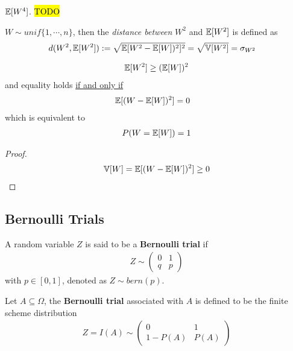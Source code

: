 \documentclass{article}
\begin{document}
   	\begin{proposition}
   		$\mathbb{E}[{W^4}]$. \hl{TODO}
   	\end{proposition}
   	
   	\begin{definition}
   		$W \sim unif\{1, \cdots, n\}$, then the \emph{distance between} $W^2$ and $\mathbb{E}[{W^2}]$ is defined as
   		\begin{align}
   			d(W^2, \mathbb{E}[{W^2}]) &:= \sqrt{\mathbb{E}[{W^2 - \mathbb{E}[{W}])^2}]^2} = \sqrt{\mathbb{V}[{W^2}]} = \sigma_{W^2}
   		\end{align}
   	\end{definition}
   	
   	\begin{corollary}
   		\begin{align}
   			\mathbb{E}[{W^2}] \geq (\mathbb{E}[{W}])^2
   		\end{align}
   		and equality holds \ul{if and only if}
   		\begin{align}
   			\mathbb{E}[{(W - \mathbb{E}[{W}])^2}] &= 0
   		\end{align}
   		which is equivalent to
   		\begin{align}
   			P(W = \mathbb{E}[{W}]) = 1
   		\end{align}
   	\end{corollary}
   	\begin{proof}
   		\begin{align}
	   		\mathbb{V}[{W}] = \mathbb{E}[{(W - \mathbb{E}[{W}])^2}] \geq 0
   		\end{align}
   	\end{proof}
   	
   	
   	
   	\subsection{Bernoulli Trials}
   	\begin{definition}
   		A random variable $Z$ is said to be a \textbf{Bernoulli trial} if 
   		\begin{align}
   			Z \sim\left(\begin{array}{ll}{0} & {1} \\ {q} & {p}\end{array}\right)
   		\end{align}
   		with $p \in [0, 1]$, denoted as $Z \sim bern(p)$.
   	\end{definition}
   	
   	\begin{remark}
   		Let $A \subseteq \Omega$, the \textbf{Bernoulli trial} associated with $A$ is defined to be the finite scheme distribution
   		\begin{align}
   			Z=I(A) \sim\left(\begin{array}{cc}{0} & {1} \\ {1-P(A)} & {P(A)}\end{array}\right)
   		\end{align}
   	\end{remark}
   	
\end{document}
